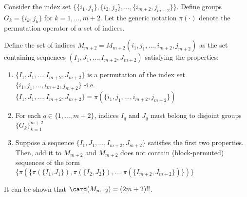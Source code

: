 \begin{IEEEproof}

Consider the index set $\{\{i_1,j_1\},\{i_2,j_2\},\dots,\{i_{m+2},j_{m+2}\}\}$. Define groups $G_k=\{i_k,j_k\}$ for $k=1,\dots,m+2$. Let the generic notation $\pi(\cdot)$ denote the permutation operator of a set of indices.

Define the set of indices $M_{m+2}=M_{m+2}(i_1,j_1,\dots,i_{m+2},j_{m+2})$ as the set containing sequences $(I_1,J_1,\dots,I_{m+2},J_{m+2})$ satisfying the properties:
\begin{enumerate}
	\item $\{I_1,J_1,\dots,I_{m+2},J_{m+2}\}$ is a permutation of the index set $\{i_1,j_1,\dots,i_{m+2},j_{m+2}\}$
		-i.e. $\{I_1,J_1,\dots,I_{m+2},J_{m+2}\} = \pi(\{i_1,j_1,\dots,i_{m+2},j_{m+2}\})$
	\item For each $q\in\{1,\dots,m+2\}$, indices $I_q$ and $J_q$
		must belong to disjoint groups $\{G_k\}_{k=1}^{m+2}$
	\item Suppose a sequence $\{I_1,J_1,\dots,I_{m+2},J_{m+2}\}$ satisfies
		the first two properties. Then, add it to $M_{m+2}$ and $M_{m+2}$ does not
		contain (block-permuted) sequences of the form $\{\pi(\{\pi(\{I_1,J_1\}),\pi(\{I_2,J_2\}),\dots,\pi(\{I_{m+2},J_{m+2}\})\})\}$
\end{enumerate}
It can be shown that $\card(M_{m+2})=(2m+2)!!$.
%


\end{IEEEproof}
